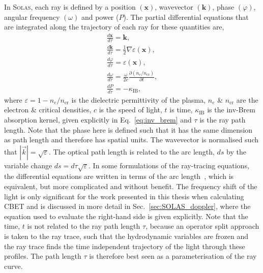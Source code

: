 In \textsc{Solas}, each ray is defined by a position $(\mathbf{x})$, wavevector $(\mathbf{k})$, phase $(\varphi)$, angular frequency $(\omega)$ and power ($P$).
The partial differential equations that are integrated along the trajectory of each ray for these quantities are,
\begin{equation}
    \label{eq:SOLAS_rays}
    \begin{gathered}
        \frac{d \mathbf{x}}{d \tau}=\mathbf{k}, \\
        \frac{d \mathbf{k}}{d \tau}=\frac{1}{2} \nabla \varepsilon(\mathbf{x}), \\
        \frac{d \varphi}{d \tau}= \varepsilon(\mathbf{x}), \\
        \frac{d \omega}{d \tau}=\frac{\omega}{2 c} \frac{\partial\left(n_e / n_{\text{cr}}\right)}{\partial t}, \\
        \frac{d P}{d \tau}=-\kappa_{\text{IB}},
    \end{gathered}
\end{equation}
where $\varepsilon=1-n_e/n_{\text{cr}}$ is the dielectric permittivity of the plasma, $n_e$ \& $n_{\text{cr}}$ are the electron \& critical densities, $c$ is the speed of light, $t$ is time, $\kappa_{\text{IB}}$ is the \ac{inv-Brem} absorption kernel, given explicitly in Eq.~\ref{eq:inv_brem} and $\tau$ is the ray path length.
Note that the phase here is defined such that it has the same dimension as path length and therefore has spatial units.
The wavevector is normalised such that $|\vec{k}|=\sqrt{\varepsilon}$.
The optical path length is related to the arc length, $ds$ by the variable change $ds=d\tau\sqrt{\varepsilon}$.
In some formulations of the ray-tracing equations, the differential equations are written in terms of the arc length~\cite{marozas_wavelength-detuning_2018,kaiser_laser_2000}, which is equivalent, but more complicated and without benefit.
The frequency shift of the light is only significant for the work presented in this thesis when calculating \ac{CBET} and is discussed in more detail in Sec.~\ref{sec:SOLAS_doppler}, where the equation used to evaluate the right-hand side is given explicitly.
Note that the time, $t$ is not related to the ray path length $\tau$, because an operator split approach is taken to the ray trace, such that the hydrodynamic variables are frozen and the ray trace finds the time independent trajectory of the light through these profiles.
The path length $\tau$ is therefore best seen as a parameterisation of the ray curve.

